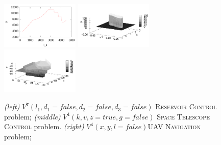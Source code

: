 ﻿%
\begin{figure}[tbp!]
\centering
\includegraphics[width=0.33\textwidth]{Figures/reserV7.pdf}
\includegraphics[width=0.33\textwidth]{Figures/telesV4-mono.pdf}
\includegraphics[width=0.33\textwidth]{Figures/uavV4-mono.pdf}
\vspace{-2mm}
\caption{\footnotesize
{\it (left)}  $V^7(l_1,d_1=false,d_2=false,d_3=false)$ \textsc{Reservoir Control} problem;
{\it (middle)} $V^4(k,v,z=true,g=false)$ \textsc{Space Telescope Control} problem.
{\it (right)}  $V^4(x,y,l=false)$\textsc{UAV Navigation} problem;
}
\label{fig:Value}
\vspace{-5mm}
\end{figure}


